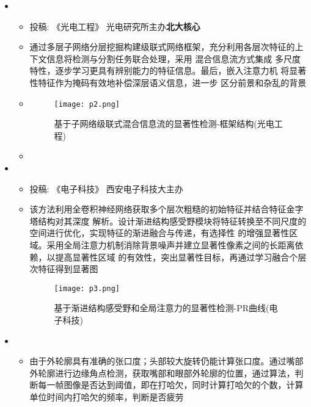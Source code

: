 \begin{itemize}[leftmargin=*]
{\begin{itemize}
      \end{itemize}
      }
    \item
      {\small
      \begin{itemize}
        \item 投稿: 《光电工程》 \qquad 光电研究所主办\qquad\textbf{北大核心} 
        \item 通过多层子网络分层挖掘构建级联式网络框架，充分利用各层次特征的上下文信息将检测与分割任务联合处理，采用 混合信息流方式集成 多尺度特性，逐步学习更具有辨别能力的特征信息。最后，嵌入注意力机 将显著性特征作为掩码有效地补偿深层语义信息，进一步
        区分前景和杂乱的背景    
        \item\begin{figure}
        	\centering
        	\texttt{[image: p2.png]}
        	\caption{基于子网络级联式混合信息流的显著性检测-框架结构(光电工程)\label{sa}}
        \end{figure}
        \item 
      \end{itemize}
      }
    \item
    {\small
    \begin{itemize}
      \item 投稿: 《电子科技》 \qquad 西安电子科技大主办\qquad\textbf{} 
      \item 该方法利用全卷积神经网络获取多个层次粗糙的初始特征并结合特征金字塔结构对其深度
      解析。设计渐进结构感受野模块将特征转换至不同尺度的空间进行优化，实现特征的渐进融合与传递，有选择性
      的增强显著性区域。采用全局注意力机制消除背景噪声并建立显著性像素之间的长距离依赖，以提高显著性区域
      的有效性，突出显著性目标，再通过学习融合个层次特征得到显著图
      \begin{figure}
      	\centering
      	\texttt{[image: p3.png]}
      	\caption{基于渐进结构感受野和全局注意力的显著性检测-PR曲线(电子科技)\label{sa}}
      \end{figure}
    \end{itemize}
    }
    \item
    {\small
    \begin{itemize}
      \item 由于外轮廓具有准确的张口度；头部较大旋转仍能计算张口度。通过嘴部外轮廓进行边缘角点检测，获取嘴部和眼部外轮廓的位置，通过算法，判断每一帧图像是否达到阈值，即在打哈欠，同时计算打哈欠的个数，计算单位时间内打哈欠的频率，判断是否疲劳

\end{itemize}}
\end{itemize}
